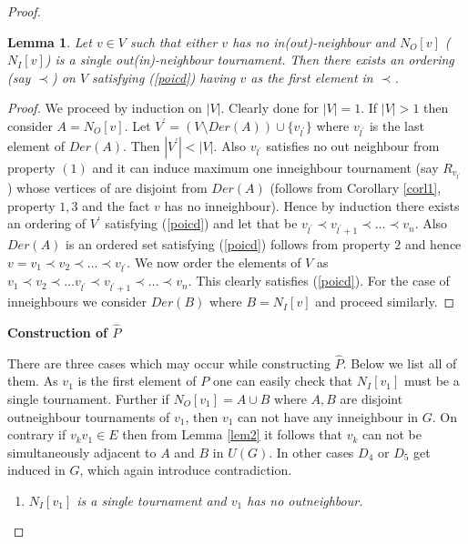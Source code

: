 \documentclass{article}
\newtheorem{lem}[thm]{Lemma}
\theoremstyle{definition}
\numberwithin{equation}{section}
\begin{document}
\begin{proof}
\begin{enumerate}
\end{enumerate}


\begin{lem}\label{lme8}
Let $v\in V$ such that either $v$ has no in(out)-neighbour and $N_{O}[v]$
($N_{I}[v]$) is a single out(in)-neighbour tournament. Then there exists an ordering (say $\prec$) on $V$ satisfying (\ref{poicd}) having $v$ as the first element in $\prec$.
\end{lem}

\begin{proof}
We proceed by induction on $|V|$. Clearly done for $|V|=1$. If $|V|>1$ then consider $A=N_{O}[v]$. Let $V^{'}=(V\setminus Der(A))\cup \{v_{l^{'}}\}$ where $v_{l^{'}}$ is the last element of $Der(A)$. Then $|V^{'}|<|V|$. 
Also $v_{l^{'}}$ satisfies no out neighbour from property $(1)$ and it can induce maximum one inneighbour tournament (say $R_{v_{l^{'}}}$) whose vertices of are disjoint from $Der(A)$ (follows from Corollary \ref{corl1}, property $1,3$ and the fact $v$ has no inneighbour). Hence by induction there exists an ordering of $V^{'}$ satisfying (\ref{poicd}) and let that be $v_{l^{'}}\prec v_{l^{'}+1}\prec \hdots \prec v_{n}$. Also $Der(A)$ is an ordered set satisfying (\ref{poicd}) follows from property $2$ and hence $v=v_{1}\prec v_{2}\prec \hdots\prec v_{l^{'}}$. We now order the elements of $V$ as $v_{1}\prec v_{2}\prec \hdots v_{l^{'}}\prec v_{l^{'}+1}\prec \hdots \prec v_{n}$. This clearly satisfies (\ref{poicd}).
For the case of inneighbours we consider $Der(B)$ where $B=N_{I}[v]$ and proceed similarly.
\end{proof}


\noindent \textbf{Construction of $\hat{P}$}

\noindent There are three cases which may occur while constructing $\hat{P}$. Below we list all of them. As $v_{1}$ is the first element of $P$ one can easily check that $N_{I}[v_{1}]$ must be a single tournament. Further if $N_{O}[v_{1}]=A\cup B$ where $A,B$ are disjoint outneighbour tournaments of $v_{1}$, then $v_{1}$ can not have any inneighbour in $G$. On contrary if $v_{k}v_{1}\in E$ then from Lemma \ref{lem2} it follows that $v_{k}$ can not be simultaneously adjacent to $A$ and $B$ in $U(G)$. In other cases $D_{4}$ or $D_{5}$ get induced in $G$, which again introduce contradiction.




\begin{enumerate}

\item \textit{$N_{I}[v_{1}]$ is a single tournament and $v_{1}$ has no outneighbour.}


\end{enumerate}
\end{proof}
\end{document}
